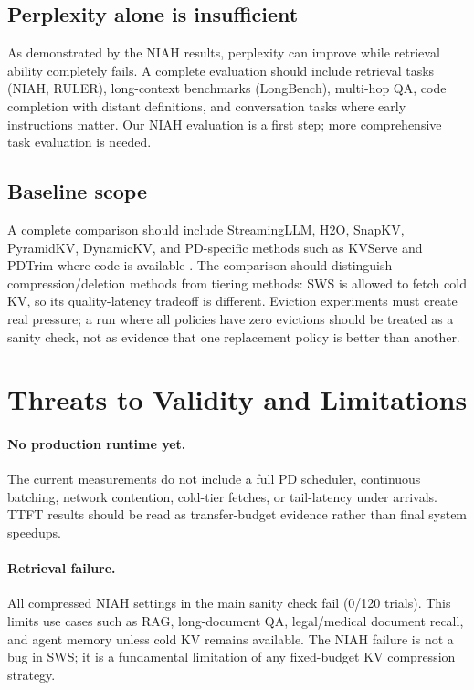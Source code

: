 \documentclass[11pt]{article}
\newcommand{\method}{SWS}
\newcommand{\sws}{SWS}
\theoremstyle{definition}
\theoremstyle{plain}
\begin{document}
\subsection{Perplexity alone is insufficient}
As demonstrated by the NIAH results, perplexity can improve while retrieval ability completely fails.  A complete evaluation should include retrieval tasks (NIAH, RULER), long-context benchmarks (LongBench), multi-hop QA, code completion with distant definitions, and conversation tasks where early instructions matter.  Our NIAH evaluation is a first step; more comprehensive task evaluation is needed.

\subsection{Baseline scope}
A complete comparison should include StreamingLLM, H2O, SnapKV, PyramidKV, DynamicKV, and PD-specific methods such as KVServe and PDTrim where code is available \citep{streamingllm,h2o,snapkv,pyramidkv,dynamickv,kvserve,pdtrim}.  The comparison should distinguish compression/deletion methods from tiering methods: \method{} is allowed to fetch cold KV, so its quality-latency tradeoff is different.  Eviction experiments must create real pressure; a run where all policies have zero evictions should be treated as a sanity check, not as evidence that one replacement policy is better than another.

\section{Threats to Validity and Limitations}
\label{sec:limitations}

\paragraph{No production runtime yet.}
The current measurements do not include a full PD scheduler, continuous batching, network contention, cold-tier fetches, or tail-latency under arrivals.  TTFT results should be read as transfer-budget evidence rather than final system speedups.

\paragraph{Retrieval failure.}
All compressed NIAH settings in the main sanity check fail (0/120 trials).  This limits use cases such as RAG, long-document QA, legal/medical document recall, and agent memory unless cold KV remains available.  The NIAH failure is not a bug in \sws{}; it is a fundamental limitation of any fixed-budget KV compression strategy.
\end{document}
